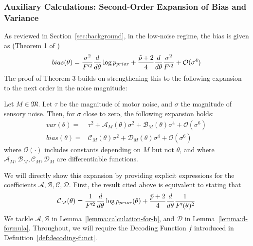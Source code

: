 \subsubsection{Auxiliary Calculations: Second-Order Expansion of Bias and Variance}\label{sec:thm-2-auxiliary}

As reviewed in Section~\ref{sec:background}, in the low-noise regime, the bias is given as (Theorem 1 of \cite{hahn2024unifying})
\begin{equation}
bias(\theta) = \frac{\sigma^2}{F'^2} \frac{d}{d\theta} \log p_{prior} + \frac{\tilde{p}+2}{4} \frac{d}{d\theta} \frac{\sigma^2}{F'^2}  + \mathcal{O}(\sigma^4)
\end{equation}
The proof of Theorem 3 builds on strengthening this to the following expansion to the next order in the noise magnitude:
\begin{lemma}\label{lemma:expansion}
Let $M \in \mathfrak{M}$.
Let $\tau$ be the magnitude of motor noise, and $\sigma$ the magnitude of sensory noise.
Then, for $\sigma$ close to zero, the following expansion holds:
    \begin{align*}
var(\theta) =& \tau^2 + \mathcal{A}_M(\theta) \sigma^2 + \mathcal{B}_M(\theta) \sigma^4 + \mathcal{O}(\sigma^6) \\
    bias(\theta) =& \mathcal{C}_M(\theta) \sigma^2 + \mathcal{D}_M(\theta) \sigma^4 + \mathcal{O}(\sigma^6)
\end{align*}
where $\mathcal{O}(\cdot)$ includes constants depending on $M$ but not $\theta$, and where $\mathcal{A}_M, \mathcal{B}_M, \mathcal{C}_M, \mathcal{D}_M$ are differentiable functions.
\end{lemma}
We will directly show this expansion by providing explicit expressions for the coefficients $\mathcal{A, B, C, D}$.
First, the result cited above is equivalent to stating that
\begin{equation}\label{eq:c-coefficient}
    \mathcal{C}_M(\theta) = \frac{1}{F'^2} \frac{d}{d\theta} \log p_{prior}(\theta) + \frac{\tilde{p}+2}{4} \frac{d}{d\theta} \frac{1}{F'(\theta)^2} 
        \end{equation}
We tackle $\mathcal{A, B}$ in Lemma~\ref{lemma:calculation-for-b}, and $\mathcal{D}$ in Lemma~\ref{lemma:d-formula}.
Throughout, we will require the Decoding Function $f$ introduced in Definition~\ref{def:decoding-funct}.


